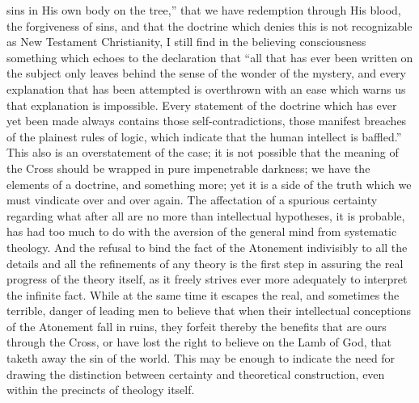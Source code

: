\documentclass[12pt,a5paper]{article}
\begin{document}
sins in His own body on the tree,'' that we have redemption
through His blood, the forgiveness of sins, and that the doctrine
which denies this is not recognizable as New Testament
Christianity, I still find in the believing consciousness something
which echoes to the declaration that ``all that has ever
been written on the subject only leaves behind the sense of
the wonder of the mystery, and every explanation that has
been attempted is overthrown with an ease which warns us
that explanation is impossible. Every statement of the
doctrine which has ever yet been made always contains
those self-contradictions, those manifest breaches of the
plainest rules of logic, which indicate that the human
intellect is baffled.'' This also is an overstatement of the
case; it is not possible that the meaning of the Cross
should be wrapped in pure impenetrable darkness; we have
the elements of a doctrine, and something more; yet it is a
side of the truth which we must vindicate over and over
again. The affectation of a spurious certainty regarding
what after all are no more than intellectual hypotheses, it is
probable, has had too much to do with the aversion of the
general mind from systematic theology. And the refusal to
bind the fact of the Atonement indivisibly to all the details
and all the refinements of any theory is the first step in
assuring the real progress of the theory itself, as it freely
strives ever more adequately to interpret the infinite fact.
While at the same time it escapes the real, and sometimes
the terrible, danger of leading men to believe that when
their intellectual conceptions of the Atonement fall in
ruins, they forfeit thereby the benefits that are ours
through the Cross, or have lost the right to believe on the
Lamb of God, that taketh away the sin of the world.
This may be enough to indicate the need for drawing the
distinction between certainty and theoretical construction,
even within the precincts of theology itself.
\end{document}
